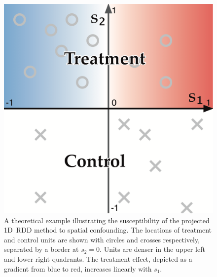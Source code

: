 \documentclass[letter,12pt]{article}
\begin{document}
\begin{figure}[tbp]
    \centering
    \includegraphics[height=0.35\textheight]{figures/confounding/confounding.png}
    \caption{A theoretical example illustrating the susceptibility of the projected 1D~RDD method to spatial confounding. The locations of treatment and control units are shown with circles and crosses respectively, separated by a border at \(s_2 = 0\). Units are denser in the upper left and lower right quadrants. The treatment effect, depicted as a gradient from blue to red, increases linearly with \(s_1\). \label{fig:confounding}}
\end{figure}
\end{document}
